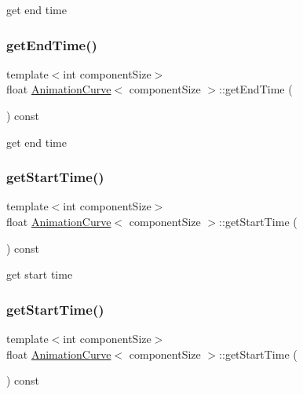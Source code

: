 get end time \mbox{\label{classAnimationCurve_a1d5ac1225ffe25eab4767d86a612dd0e}} 
\subsubsection{\texorpdfstring{get\+End\+Time()}{getEndTime()}\hspace{0.1cm}{\footnotesize\ttfamily [2/2]}}
{\footnotesize\ttfamily template$<$int component\+Size$>$ \\
float \hyperlink{classAnimationCurve}{Animation\+Curve}$<$ component\+Size $>$\+::get\+End\+Time (\begin{DoxyParamCaption}{ }\end{DoxyParamCaption}) const}

get end time \mbox{\label{classAnimationCurve_ae06c8b473c612580a4a19aff7ab6324c}} 
\subsubsection{\texorpdfstring{get\+Start\+Time()}{getStartTime()}\hspace{0.1cm}{\footnotesize\ttfamily [1/2]}}
{\footnotesize\ttfamily template$<$int component\+Size$>$ \\
float \hyperlink{classAnimationCurve}{Animation\+Curve}$<$ component\+Size $>$\+::get\+Start\+Time (\begin{DoxyParamCaption}{ }\end{DoxyParamCaption}) const}

get start time \mbox{\label{classAnimationCurve_ae06c8b473c612580a4a19aff7ab6324c}} 
\subsubsection{\texorpdfstring{get\+Start\+Time()}{getStartTime()}\hspace{0.1cm}{\footnotesize\ttfamily [2/2]}}
{\footnotesize\ttfamily template$<$int component\+Size$>$ \\
float \hyperlink{classAnimationCurve}{Animation\+Curve}$<$ component\+Size $>$\+::get\+Start\+Time (\begin{DoxyParamCaption}{ }\end{DoxyParamCaption}) const}

